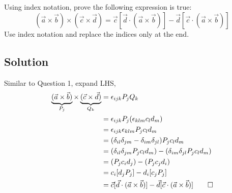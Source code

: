 \section{}
Using index notation, prove the following expression is true:
\begin{equation*}
    (\vec{a} \times \vec{b}) \times (\vec{c} \times \vec{d}) = \vec{c}[ \vec{d} \cdot (\vec{a} \times \vec{b})] - \vec{d}[ \vec{c} \cdot (\vec{a} \times \vec{b})]
\end{equation*}
Use index notation and replace the indices only at the end.

\subsection*{Solution}
Similar to Question 1, expand LHS,
\begin{align*}
    \underbrace{(\vec{a} \times \vec{b})}_{P_j} \times \underbrace{(\vec{c} \times \vec{d})}_{Q_k} &= \epsilon_{ijk} P_j Q_k \\
    &= \epsilon_{ijk} P_j (\epsilon_{klm} c_l d_m) \\
    &= \epsilon_{ijk} \epsilon_{klm} P_j c_l d_m \\
    &= (\delta_{il} \delta_{jm} - \delta_{im} \delta_{jl}) P_j c_l d_m \\
    &= (\delta_{il} \delta_{jm} P_j c_l d_m) - (\delta_{im} \delta_{jl} P_j c_l d_m) \\
    &= (P_j c_i d_j) - (P_j c_j d_i) \\
    &= c_i [d_j P_j] - d_i [c_j P_j] \\
    &= \vec{c} [ \vec{d} \cdot (\vec{a} \times \vec{b})] - \vec{d} [ \vec{c} \cdot (\vec{a} \times \vec{b})] \qed
\end{align*}    